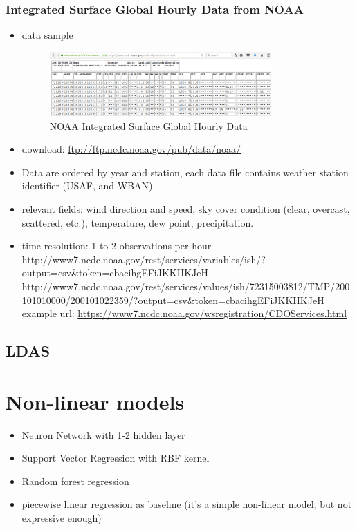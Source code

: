 \documentclass[12pt]{article}
\begin{document}
\subsubsection{\href{https://gis.ncdc.noaa.gov/geoportal/catalog/search/resource/details.page?id=gov.noaa.ncdc:C00532}{Integrated Surface Global Hourly Data from NOAA}}
\begin{itemize}
\item data sample
  \begin{figure}[h!]
    \centering
    \includegraphics[width=0.8\textwidth]{images/noaa_ish.png}
    \caption{\href{https://gis.ncdc.noaa.gov/geoportal/catalog/search/resource/details.page?id=gov.noaa.ncdc:C00532}{NOAA Integrated Surface Global Hourly Data}}
    \label{fig:noaa_ish}
  \end{figure}
  \FloatBarrier
\item download: \url{ftp://ftp.ncdc.noaa.gov/pub/data/noaa/}
\item Data are ordered by year and station, each data file contains
  weather station identifier (USAF, and WBAN)
\item relevant fields: wind direction and speed, sky cover condition
  (clear, overcast, scattered, etc.), temperature, dew point,
  precipitation. 
\item time resolution: 1 to 2 observations per hour
http://www7.ncdc.noaa.gov/rest/services/variables/ish/?output=csv&token=cbacihgEFiJKKIIKJeH
http://www7.ncdc.noaa.gov/rest/services/values/ish/72315003812/TMP/200101010000/200101022359/?output=csv&token=cbacihgEFiJKKIIKJeH
example url: \url{https://www7.ncdc.noaa.gov/wsregistration/CDOServices.html}
\end{itemize}
\subsection{LDAS}
\section{Non-linear models}
\begin{itemize}
\item Neuron Network with 1-2 hidden layer
\item Support Vector Regression with RBF kernel
\item Random forest regression~\cite{randomForestWiki2016}
\item piecewise linear regression as baseline (it's a simple non-linear model, but not expressive enough)
\end{itemize}
\newpage


\end{document}
